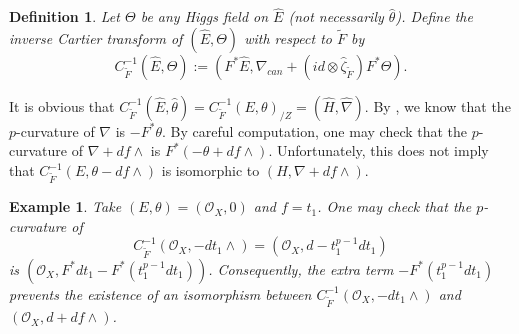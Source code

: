 \documentclass[12pt, a4paper]{article}
\newtheorem{definition}{Definition}[section]
\newtheorem{example}{Example}[section]
\begin{document}
\begin{definition}
Let $\Theta$ be any Higgs field on $\hat E$ (not necessarily $\hat\theta$). Define the inverse Cartier transform of $(\hat E,\Theta)$ with respect to $\tilde F$ by 
$$
C^{-1}_{\tilde F}(\hat E,\Theta):=(F^*\hat E,\nabla_{can}+(id\otimes\hat{\zeta}_{\tilde F})F^*\Theta).
$$
\end{definition}
It is obvious that $C^{-1}_{\tilde F}(\hat E,\hat\theta)=C^{-1}_{\tilde F}(E,\theta)_{/Z}=(\hat H,\hat\nabla)$. By \cite[Theorem 2.8, 3]{OV}, we know that the $p$-curvature of $\nabla$ is $-F^*\theta$. By careful computation, one may check that the $p$-curvature of $\nabla+df\wedge$ is $F^*(-\theta+df\wedge)$. Unfortunately, this does not imply that $C_{\tilde F}^{-1}(E,\theta-df\wedge)$ is isomorphic to $(H,\nabla+df\wedge)$.
\begin{example}
Take $(E,\theta)=(\mathcal O_X,0)$ and $f=t_1$. One may check that the $p$-curvature of 
$$C^{-1}_{\tilde F}(\mathcal O_X,-dt_1\wedge)=(\mathcal O_X,d-t_1^{p-1}dt_1)$$
is $(\mathcal O_X,F^*dt_1-F^*(t_1^{p-1}dt_1))$. Consequently, the extra term $-F^*(t_1^{p-1}dt_1)$ prevents the existence of an isomorphism between $C^{-1}_{\tilde F}(\mathcal O_X,-dt_1\wedge)$ and $(\mathcal O_X,d+df\wedge)$.
\end{example}
\end{document}
